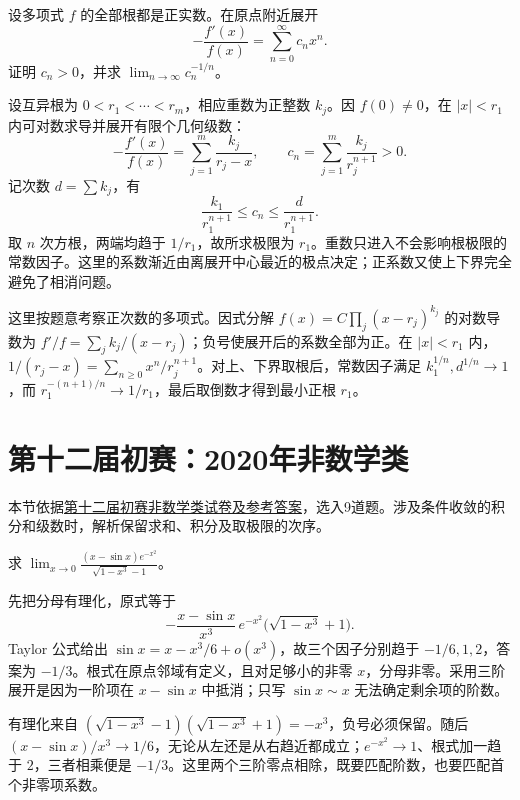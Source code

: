 \documentclass[UTF8,12pt,a4paper,fontset=fandol]{ctexart}
\begin{document}
\begin{example}\label{nm-2019-5}
设多项式 $f$ 的全部根都是正实数。在原点附近展开
\[
 -\frac{f'(x)}{f(x)}=\sum_{n=0}^\infty c_nx^n.
\]
证明 $c_n>0$，并求 $\displaystyle\lim_{n\to\infty}c_n^{-1/n}$。
\end{example}
\begin{solve}
设互异根为 $0<r_1<\cdots<r_m$，相应重数为正整数 $k_j$。因 $f(0)\ne0$，在 $|x|<r_1$ 内可对数求导并展开有限个几何级数：
\[
 -\frac{f'(x)}{f(x)}=\sum_{j=1}^m\frac{k_j}{r_j-x},
 \qquad c_n=\sum_{j=1}^m\frac{k_j}{r_j^{n+1}}>0.
\]
记次数 $d=\sum k_j$，有
\[
 \frac{k_1}{r_1^{n+1}}\leq c_n\leq\frac d{r_1^{n+1}}.
\]
取 $n$ 次方根，两端均趋于 $1/r_1$，故所求极限为 $r_1$。重数只进入不会影响根极限的常数因子。这里的系数渐近由离展开中心最近的极点决定；正系数又使上下界完全避免了相消问题。

这里按题意考察正次数的多项式。因式分解 $f(x)=C\prod_j(x-r_j)^{k_j}$ 的对数导数为 $f'/f=\sum_jk_j/(x-r_j)$；负号使展开后的系数全部为正。在 $|x|<r_1$ 内，$1/(r_j-x)=\sum_{n\ge0}x^n/r_j^{n+1}$。对上、下界取根后，常数因子满足 $k_1^{1/n},d^{1/n}\to1$，而 $r_1^{-(n+1)/n}\to1/r_1$，最后取倒数才得到最小正根 $r_1$。

\end{solve}

\section{第十二届初赛：2020年非数学类}
本节依据\href{https://math.ecnu.edu.cn/llin/pdf_files/nonmathans2020.pdf}{第十二届初赛非数学类试卷及参考答案}，选入9道题。涉及条件收敛的积分和级数时，解析保留求和、积分及取极限的次序。

\begin{example}\label{nm-2020-1a}
求 $\displaystyle\lim_{x\to0}\frac{(x-\sin x)e^{-x^2}}{\sqrt{1-x^3}-1}$。
\end{example}
\begin{solve}
先把分母有理化，原式等于
\[
 -\frac{x-\sin x}{x^3}\,e^{-x^2}\bigl(\sqrt{1-x^3}+1\bigr).
\]
Taylor 公式给出 $\sin x=x-x^3/6+o(x^3)$，故三个因子分别趋于 $-1/6,1,2$，答案为 $-1/3$。根式在原点邻域有定义，且对足够小的非零 $x$，分母非零。采用三阶展开是因为一阶项在 $x-\sin x$ 中抵消；只写 $\sin x\sim x$ 无法确定剩余项的阶数。

有理化来自 $(\sqrt{1-x^3}-1)(\sqrt{1-x^3}+1)=-x^3$，负号必须保留。随后 $(x-\sin x)/x^3\to1/6$，无论从左还是从右趋近都成立；$e^{-x^2}\to1$、根式加一趋于 $2$，三者相乘便是 $-1/3$。这里两个三阶零点相除，既要匹配阶数，也要匹配首个非零项系数。

\end{solve}
\end{document}
